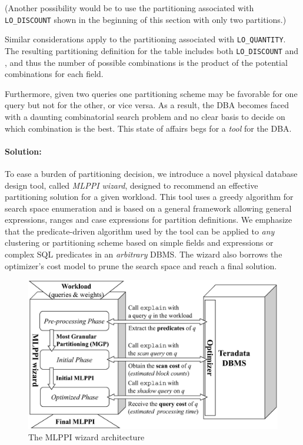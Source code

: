 \documentclass[runningheads]{comsis2}
\begin{document}
(Another possibility would be to use the partitioning associated with {\tt LO\_DISCOUNT} shown 
in the beginning of this section with only two partitions.)

Similar considerations apply to the partitioning associated with {\tt LO\_QUANTITY}. 
The resulting partitioning definition for the table includes both {\tt LO\_DISCOUNT}
and , and thus the number of possible combinations is the product of 
the potential combinations for each field. 

Furthermore, given two queries one partitioning scheme may be favorable for one query but not for the other, or vice versa. 
As a result, the DBA becomes faced with a daunting combinatorial search problem 
and no clear basis to decide on which combination is the best. 
This state of affairs begs for a {\em tool} for the DBA.

\paragraph{Solution:} 
To ease a burden of partitioning decision, 
we introduce a novel physical database design tool, called {\em MLPPI wizard}, 
designed to recommend an effective partitioning solution for a given workload.
This tool uses a greedy algorithm for search space enumeration 
and is based on a general framework allowing general expressions, 
ranges and case expressions for partition definitions. 
We emphasize that the \hbox{predicate-driven} algorithm used by the tool can be applied 
to {\em any} clustering or partitioning scheme based on simple fields and expressions or complex SQL predicates 
in an {\em arbitrary} DBMS. 
The wizard also borrows the optimizer's cost model 
to prune the search space and reach a final solution. 

\begin{figure}[htp!]
\centering
\includegraphics[scale=0.48]{architecture}
\vspace{-0.1in}
\caption{The MLPPI wizard architecture\label{fig:arch}}
\end{figure}
\end{document}
